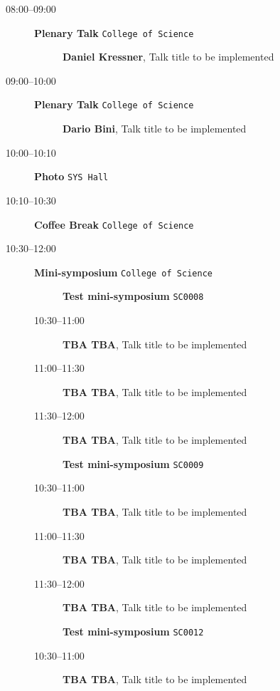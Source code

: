 \documentclass[ILAS2025-program.tex]{subfiles}
\begin{document}
    \begin{description}
    \item[08:00--09:00] \textbf{Plenary Talk} {\footnotesize\texttt{College of Science}}
    \begin{description}
        \item[] \textbf{Daniel Kressner}, Talk title to be implemented
        \end{description}
        \item[09:00--10:00] \textbf{Plenary Talk} {\footnotesize\texttt{College of Science}}
    \begin{description}
        \item[] \textbf{Dario Bini}, Talk title to be implemented
        \end{description}
        \item[10:00--10:10] \textbf{Photo} {\footnotesize\texttt{SYS Hall}}
    \item[10:10--10:30] \textbf{Coffee Break} {\footnotesize\texttt{College of Science}}
    \item[10:30--12:00] \textbf{Mini-symposium} {\footnotesize\texttt{College of Science}}
    \begin{description}
    \item[] \textbf{Test mini-symposium} {\footnotesize\texttt{SC0008}}
    \item[10:30--11:00] \textbf{TBA TBA}, Talk title to be implemented
        \item[11:00--11:30] \textbf{TBA TBA}, Talk title to be implemented
        \item[11:30--12:00] \textbf{TBA TBA}, Talk title to be implemented
        \end{description}
    \begin{description}
    \item[] \textbf{Test mini-symposium} {\footnotesize\texttt{SC0009}}
    \item[10:30--11:00] \textbf{TBA TBA}, Talk title to be implemented
        \item[11:00--11:30] \textbf{TBA TBA}, Talk title to be implemented
        \item[11:30--12:00] \textbf{TBA TBA}, Talk title to be implemented
        \end{description}
    \begin{description}
    \item[] \textbf{Test mini-symposium} {\footnotesize\texttt{SC0012}}
    \item[10:30--11:00] \textbf{TBA TBA}, Talk title to be implemented

\end{description}
\end{description}
\end{document}
